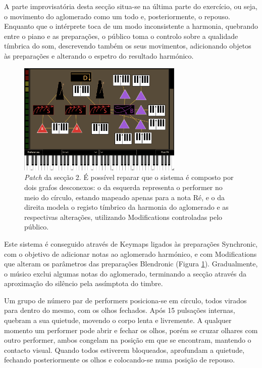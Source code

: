 \documentclass[../main.tex]{subfiles}
\begin{document}
A parte improvisatória desta secção situa-se na última parte do exercício, ou seja, o movimento do aglomerado como um todo e, posteriormente, o repouso. Enquanto que o intérprete toca de um modo inconsistente a harmonia, quebrando entre o piano e as preparações, o público toma o controlo sobre a qualidade tímbrica do som, descrevendo também os seus movimentos, adicionando objetos às preparações e alterando o espetro do resultado harmónico.

\begin{figure}[h]
    \centering
    \captionsetup{width=0.8\textwidth}
    \includegraphics[width=0.7\textwidth]{images/bit2.png}
    \caption{\textsl{Patch} da secção 2. É possível reparar que o sistema é composto por dois grafos desconexos: o da esquerda representa o performer no meio do círculo, estando mapeado apenas para a nota Ré, e o da direita modela o registo tímbrico da harmonia do aglomerado e as respectivas alterações, utilizando Modifications controladas pelo público.}
    \label{fig:bit2}
\end{figure}

Este sistema é conseguido através de Keymaps ligados às preparações Synchronic, com o objetivo de adicionar notas ao aglomerado harmónico, e com Modifications que alteram os parâmetros das preparações Blendronic (Figura \ref{fig:bit2}). Gradualmente, o músico exclui algumas notas do aglomerado, terminando a secção através da aproximação do silêncio pela assímptota do timbre.

\begin{performex}
    Um grupo de número par de performers posiciona-se em círculo, todos virados para dentro do mesmo, com os olhos fechados. Após 15 pulsações internas, quebram a sua quietude, movendo o corpo lenta e livremente. A qualquer momento um performer pode abrir e fechar os olhos, porém se cruzar olhares com outro performer, ambos congelam na posição em que se encontram, mantendo o contacto visual. Quando todos estiverem bloqueados, aprofundam a quietude, fechando posteriormente os olhos e colocando-se numa posição de repouso.
\end{performex}
\end{document}

